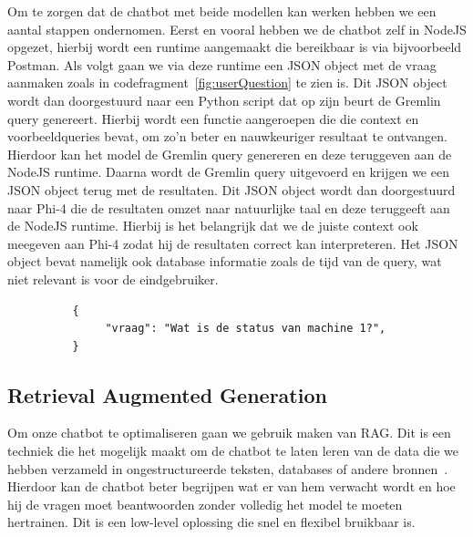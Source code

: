 Om te zorgen dat de chatbot met beide modellen kan werken hebben we een aantal stappen ondernomen.
Eerst en vooral hebben we de chatbot zelf in NodeJS opgezet, hierbij wordt een runtime aangemaakt die bereikbaar is via bijvoorbeeld Postman.
Als volgt gaan we via deze runtime een JSON object met de vraag aanmaken zoals in codefragment~\ref{fig:userQuestion} te zien is.
Dit JSON object wordt dan doorgestuurd naar een Python script dat op zijn beurt de Gremlin query genereert.
Hierbij wordt een functie aangeroepen die die context en voorbeeldqueries bevat, om zo'n beter en nauwkeuriger resultaat te ontvangen.
Hierdoor kan het model de Gremlin query genereren en deze teruggeven aan de NodeJS runtime.
Daarna wordt de Gremlin query uitgevoerd en krijgen we een JSON object terug met de resultaten.
Dit JSON object wordt dan doorgestuurd naar Phi-4 die de resultaten omzet naar natuurlijke taal en deze teruggeeft aan de NodeJS runtime.
Hierbij is het belangrijk dat we de juiste context ook meegeven aan Phi-4 zodat hij de resultaten correct kan interpreteren.
Het JSON object bevat namelijk ook database informatie zoals de tijd van de query, wat niet relevant is voor de eindgebruiker.

\begin{listing}[H]
     \begin{verbatim}
          {
               "vraag": "Wat is de status van machine 1?",
          }
     \end{verbatim}
     \caption[Voorbeeld JSON vraag]{\label{fig:userQuestion}Voorbeeld van vraag in JSON.}
\end{listing}

\subsection{Retrieval Augmented Generation}
Om onze chatbot te optimaliseren gaan we gebruik maken van RAG.\@
Dit is een techniek die het mogelijk maakt om de chatbot te laten leren van de data die we hebben verzameld in ongestructureerde teksten, databases of andere bronnen~\autocite{Zeichick2023}.
Hierdoor kan de chatbot beter begrijpen wat er van hem verwacht wordt en hoe hij de vragen moet beantwoorden zonder volledig het model te moeten hertrainen.
Dit is een low-level oplossing die snel en flexibel bruikbaar is.

